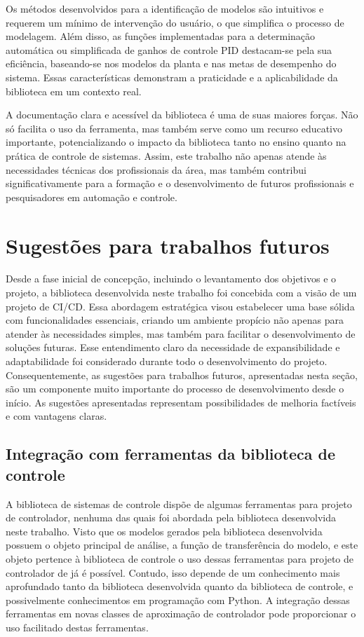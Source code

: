 Os métodos desenvolvidos para a identificação de modelos são intuitivos e requerem um mínimo de intervenção do usuário,
o que simplifica o processo de modelagem.
Além disso, as funções implementadas para a determinação automática ou simplificada de ganhos de controle PID
destacam-se pela sua eficiência, baseando-se nos modelos da planta e nas metas de desempenho do sistema.
Essas características demonstram a praticidade e a aplicabilidade da biblioteca em um contexto real.

A documentação clara e acessível da biblioteca é uma de suas maiores forças.
Não só facilita o uso da ferramenta, mas também serve como um recurso educativo importante, potencializando o impacto
da biblioteca tanto no ensino quanto na prática de controle de sistemas.
Assim, este trabalho não apenas atende às necessidades técnicas dos profissionais da área, mas também contribui
significativamente para a formação e o desenvolvimento de futuros profissionais e pesquisadores em automação e controle.

\section{Sugestões para trabalhos futuros}

Desde a fase inicial de concepção, incluindo o levantamento dos objetivos e o projeto, a biblioteca desenvolvida neste
trabalho foi concebida com a visão de um projeto de CI/CD.
Essa abordagem estratégica visou estabelecer uma base sólida com funcionalidades essenciais, criando um ambiente
propício não apenas para atender às necessidades simples, mas também para facilitar o desenvolvimento de soluções
futuras.
Esse entendimento claro da necessidade de expansibilidade e adaptabilidade foi considerado durante todo o
desenvolvimento do projeto.
Consequentemente, as sugestões para trabalhos futuros, apresentadas nesta seção, são um componente muito importante
do processo de desenvolvimento desde o início.
As sugestões apresentadas representam possibilidades de melhoria factíveis e com vantagens claras.

\subsection{Integração com ferramentas da biblioteca de controle}
A biblioteca de sistemas de controle dispõe de algumas ferramentas para projeto de controlador, nenhuma das quais foi
abordada pela biblioteca desenvolvida neste trabalho.
Visto que os modelos gerados pela biblioteca desenvolvida possuem o objeto principal de análise, a função de
transferência do modelo, e este objeto pertence à biblioteca de controle o uso dessas ferramentas para projeto de
controlador de já é possível.
Contudo, isso depende de um conhecimento mais aprofundado tanto da biblioteca desenvolvida quanto da biblioteca de
controle, e possivelmente conhecimentos em programação com Python.
A integração dessas ferramentas em novas classes de aproximação de controlador pode proporcionar o uso facilitado destas
ferramentas.


